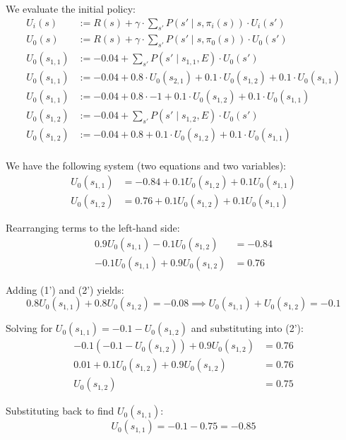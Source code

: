 We evaluate the initial policy:
\begin{align*}
U_i(s) &:= R(s) + \gamma \cdot \sum_{s'} P(s' \mid s, \pi_i(s)) \cdot U_i(s') \\ 
U_0(s) &:= R(s) + \gamma \cdot \sum_{s'} P(s' \mid s, \pi_0(s)) \cdot U_0(s') \\ 
U_0(s_{1,1}) &:= -0.04 + \sum_{s'} P(s' \mid s_{1,1}, E) \cdot U_0(s') \\ 
U_0(s_{1,1}) &:= -0.04 + 0.8 \cdot U_0(s_{2,1}) + 0.1 \cdot U_0(s_{1,2}) + 0.1 \cdot U_0(s_{1,1}) \\ 
U_0(s_{1,1}) &:= -0.04 + 0.8 \cdot -1 + 0.1 \cdot U_0(s_{1,2}) + 0.1 \cdot U_0(s_{1,1}) \\ 
U_0(s_{1,2}) &:= -0.04 + \sum_{s'} P(s' \mid s_{1,2}, E) \cdot U_0(s') \\ 
U_0(s_{1,2}) &:= -0.04 + 0.8 + 0.1 \cdot U_0(s_{1,2}) +  0.1 \cdot U_0(s_{1,1})\\ 
\end{align*}

We have the following system (two equations and two variables):
\begin{align}
    U_0(s_{1,1}) &= -0.84 + 0.1 U_0(s_{1,2}) + 0.1 U_0(s_{1,1}) \label{eq1} \\
    U_0(s_{1,2}) &= 0.76 + 0.1 U_0(s_{1,2}) + 0.1 U_0(s_{1,1}) \label{eq2}
\end{align}

Rearranging terms to the left-hand side:
\begin{align}
    0.9 U_0(s_{1,1}) - 0.1 U_0(s_{1,2}) &= -0.84 \tag{1'} \\
    -0.1 U_0(s_{1,1}) + 0.9 U_0(s_{1,2}) &= 0.76 \tag{2'}
\end{align}

Adding (1') and (2') yields:
\begin{equation*}
    0.8 U_0(s_{1,1}) + 0.8 U_0(s_{1,2}) = -0.08 \implies U_0(s_{1,1}) + U_0(s_{1,2}) = -0.1
\end{equation*}

Solving for $U_0(s_{1,1}) = -0.1 - U_0(s_{1,2})$ and substituting into (2'):
\begin{align*}
    -0.1(-0.1 - U_0(s_{1,2})) + 0.9 U_0(s_{1,2}) &= 0.76 \\
    0.01 + 0.1 U_0(s_{1,2}) + 0.9 U_0(s_{1,2}) &= 0.76 \\
    U_0(s_{1,2}) &= 0.75
\end{align*}

Substituting back to find $U_0(s_{1,1})$:
\begin{equation*}
    U_0(s_{1,1}) = -0.1 - 0.75 = -0.85
\end{equation*}

